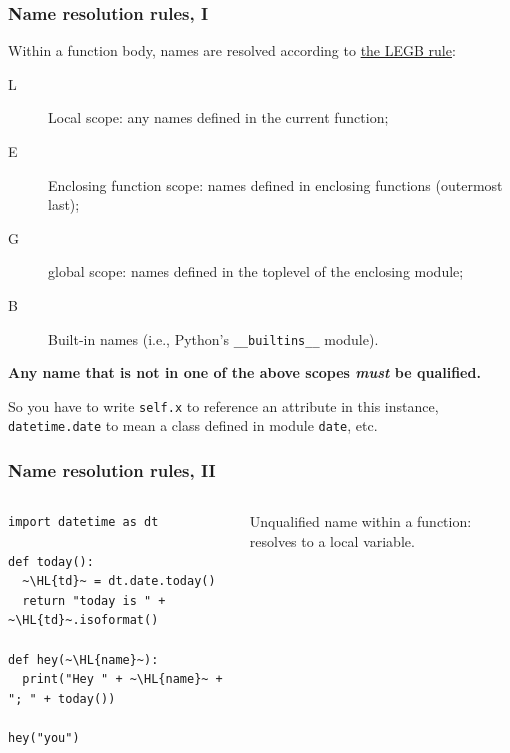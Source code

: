 \documentclass[english,serif,mathserif,xcolor=pdftex,dvipsnames,table]{beamer}
\begin{document}
\begin{frame}[fragile]
  \frametitle{Name resolution rules, I}
  \small

  Within a function body, names are resolved according to \href{http://stackoverflow.com/questions/291978/short-description-of-python-scoping-rules/292502#292502}{the LEGB rule}:
  \begin{description}
  \item[L] Local scope: any names defined in the current function;
  \item[E] Enclosing function scope: names defined in enclosing
    functions (outermost last);
  \item[G] global scope: names defined in the toplevel of the enclosing module;
  \item[B] Built-in names (i.e., Python's \texttt{\_\_builtins\_\_} module).
  \end{description}

  \+
  \textbf{Any name that is not in one of the above scopes \emph{must}
    be qualified.}

  \+
  So you have to write \texttt{self.x} to reference an attribute in
  this instance, \texttt{datetime.date} to mean a class defined in module
  \texttt{date}, etc.

\end{frame}


\begin{frame}[fragile]
  \frametitle{Name resolution rules, II}
  \begin{columns}
    \begin{column}[t]{0.6\linewidth}
\begin{lstlisting}
import datetime as dt

def today():
  ~\HL{td}~ = dt.date.today()
  return "today is " + ~\HL{td}~.isoformat()

def hey(~\HL{name}~):
  print("Hey " + ~\HL{name}~ + "; " + today())

hey("you")
\end{lstlisting}
    \end{column}
    \begin{column}[t]{0.4\linewidth}
      \raggedleft
      Unqualified name within a function: resolves to a local variable.
    \end{column}
  \end{columns}
\end{frame}
\end{document}
